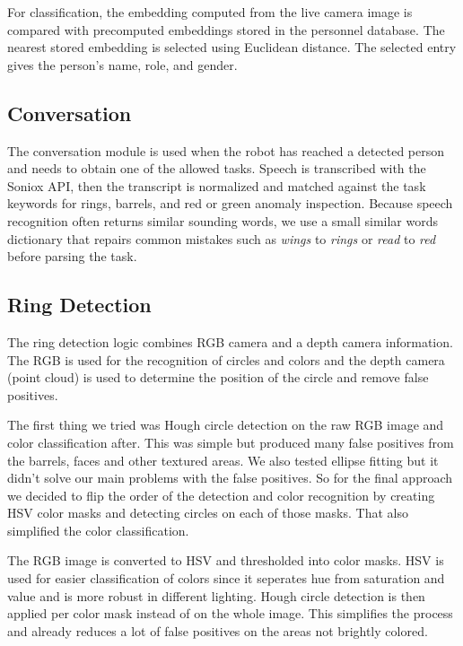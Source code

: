 \documentclass[a4paper, 11pt]{article}
\begin{document}
For classification, the embedding computed from the live camera image is compared with precomputed embeddings stored in the personnel database. The nearest stored embedding is selected using Euclidean distance. The selected entry gives the person's name, role, and gender.

\subsection{Conversation}

The conversation module is used when the robot has reached a detected person and needs
to obtain one of the allowed tasks. Speech is transcribed with the Soniox API, then the
transcript is normalized and matched against the task keywords for rings, barrels, and
red or green anomaly inspection. Because speech recognition often returns similar
sounding words, we use a small similar words dictionary that repairs common mistakes such
as \emph{wings} to \emph{rings} or \emph{read} to \emph{red} before parsing the task.

\subsection{Ring Detection}

The ring detection logic combines RGB camera and a depth camera information. The RGB is used for the recognition of circles and colors and the depth camera (point cloud) is used to determine the position of the circle and remove false positives.

The first thing we tried was Hough circle detection on the raw RGB image and color classification after. This was simple but produced many false positives from the barrels, faces and other textured areas. We also tested ellipse fitting but it didn't solve our main problems with the false positives. So for the final approach we decided to flip the order of the detection and color recognition by creating HSV color masks and detecting circles on each of those masks. That also simplified the color classification.

The RGB image is converted to HSV and thresholded into color masks. HSV is used for easier classification of colors since it seperates hue from saturation and value and is more robust in different lighting. Hough circle detection is then applied per color mask instead of on the whole image. This simplifies the process and already reduces a lot of false positives on the areas not brightly colored.
\end{document}
